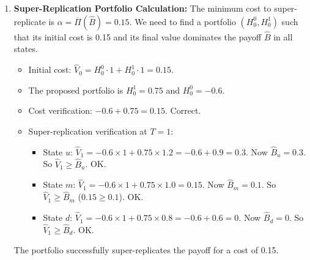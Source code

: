 \begin{enumerate}
\begin{itemize}
        \item $E_{\bar{P}_2}[\hat{B}] = 0 \times 0.3 + 1 \times 0.1 + 0 \times 0 = 0.1$.
    \end{itemize}
    The price interval is therefore $]0.1, 0.15[$.
    \item \textbf{Super-Replication Portfolio Calculation:} The minimum cost to super-replicate is $\alpha = \overline{\Pi}(\hat{B}) = 0.15$. We need to find a portfolio $(H_0^0, H_0^1)$ such that its initial cost is 0.15 and its final value dominates the payoff $\hat{B}$ in all states.
    \begin{itemize}
        \item Initial cost: $\hat{V}_0 = H_0^0 \cdot 1 + H_0^1 \cdot 1 = 0.15$.
        \item The proposed portfolio is $H_0^1 = 0.75$ and $H_0^0 = -0.6$.
        \item Cost verification: $-0.6 + 0.75 = 0.15$. Correct.
        \item Super-replication verification at $T=1$:
        \begin{itemize}
            \item State $u$: $\hat{V}_1 = -0.6 \times 1 + 0.75 \times 1.2 = -0.6 + 0.9 = 0.3$. Now $\hat{B}_u = 0.3$. So $\hat{V}_1 \ge \hat{B}_u$. OK.
            \item State $m$: $\hat{V}_1 = -0.6 \times 1 + 0.75 \times 1.0 = 0.15$. Now $\hat{B}_m = 0.1$. So $\hat{V}_1 \ge \hat{B}_m$ ($0.15 \ge 0.1$). OK.
            \item State $d$: $\hat{V}_1 = -0.6 \times 1 + 0.75 \times 0.8 = -0.6 + 0.6 = 0$. Now $\hat{B}_d = 0$. So $\hat{V}_1 \ge \hat{B}_d$. OK.
        \end{itemize}
    \end{itemize}
    The portfolio successfully super-replicates the payoff for a cost of 0.15.
\end{enumerate}
